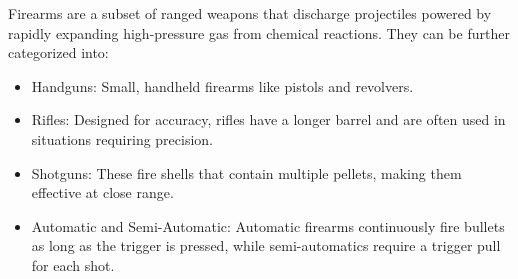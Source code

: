 Firearms are a subset of ranged weapons that discharge projectiles powered by rapidly expanding high-pressure gas from chemical reactions. They can be further categorized into:
\begin{itemize}
    \item Handguns: Small, handheld firearms like pistols and revolvers.
    \item Rifles: Designed for accuracy, rifles have a longer barrel and are often used in situations requiring precision.
    \item Shotguns: These fire shells that contain multiple pellets, making them effective at close range.
    \item Automatic and Semi-Automatic: Automatic firearms continuously fire bullets as long as the trigger is pressed, while semi-automatics require a trigger pull for each shot.
\end{itemize}


